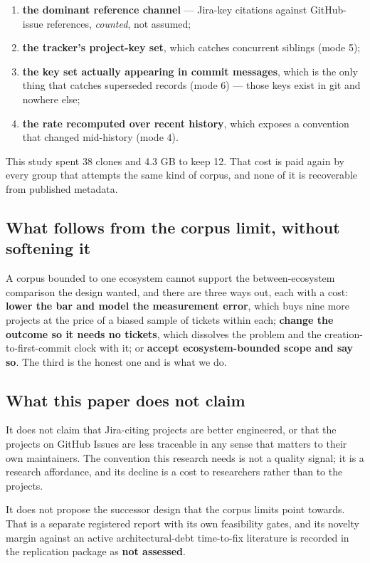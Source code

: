 \documentclass[sigconf,review,anonymous]{acmart}
\begin{document}
\begin{enumerate}
\item \textbf{the dominant reference channel} --- Jira-key citations against GitHub-issue references, \emph{counted}, not assumed;
\item \textbf{the tracker's project-key set}, which catches concurrent siblings (mode 5);
\item \textbf{the key set actually appearing in commit messages}, which is the only thing that catches superseded records (mode 6) --- those keys exist in git and nowhere else;
\item \textbf{the rate recomputed over recent history}, which exposes a convention that changed mid-history (mode 4).
\end{enumerate}

This study spent 38 clones and 4.3 GB to keep 12. That cost is paid again by every group that attempts the same kind of corpus, and none of it is recoverable from published metadata.

\subsection{What follows from the corpus limit, without softening it}
\label{sec:7.4}

A corpus bounded to one ecosystem cannot support the between-ecosystem comparison the design wanted, and there are three ways out, each with a cost: \textbf{lower the bar and model the measurement error}, which buys nine more projects at the price of a biased sample of tickets within each; \textbf{change the outcome so it needs no tickets}, which dissolves the problem and the creation-to-first-commit clock with it; or \textbf{accept ecosystem-bounded scope and say so}. The third is the honest one and is what we do.

\subsection{What this paper does not claim}
\label{sec:7.5}

It does not claim that Jira-citing projects are better engineered, or that the projects on GitHub Issues are less traceable in any sense that matters to their own maintainers. The convention this research needs is not a quality signal; it is a research affordance, and its decline is a cost to researchers rather than to the projects.

It does not propose the successor design that the corpus limits point towards. That is a separate registered report with its own feasibility gates, and its novelty margin against an active architectural-debt time-to-fix literature is recorded in the replication package as \textbf{not assessed}.
\end{document}
